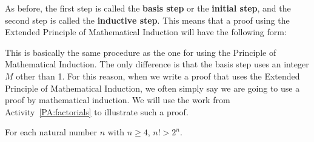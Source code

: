 As before, the first step is called the \textbf{basis step}
%
%
 or the \textbf{initial step}, and the second step is called the \textbf{inductive step}.
%
%
  This means that a proof using the Extended Principle of Mathematical Induction will have the following form:
%
\begin{center}

\end{center}
%
This is basically the same procedure as the one for using the Principle of Mathematical Induction.  The only difference is that the basis step uses an integer  $M$  other than  1.  For this reason, when we write a proof that uses the Extended Principle of Mathematical Induction, we often simply say we are going to use a proof by mathematical induction.  We will use the work from \typeu Activity~\ref*{PA:factorials} to illustrate such a proof.
%
\setcounter{equation}{0}
\begin{proposition} \label{P:factorialinduction}
For each natural number  $n$  with  $n \geq 4$,  $n! > 2^n $.
\end{proposition}
%
